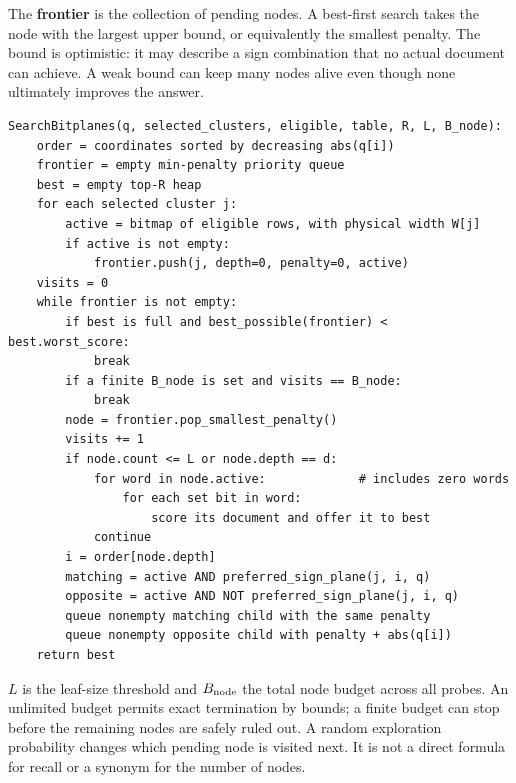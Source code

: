 The \textbf{frontier} is the collection of pending nodes. A best-first search takes the node
with the largest upper bound, or equivalently the smallest penalty. The bound is optimistic:
it may describe a sign combination that no actual document can achieve. A weak bound can keep
many nodes alive even though none ultimately improves the answer.

\par\noindent\begin{minipage}{\linewidth}
\begin{lstlisting}[caption={Dense bitplane search across the selected clusters.}]
SearchBitplanes(q, selected_clusters, eligible, table, R, L, B_node):
    order = coordinates sorted by decreasing abs(q[i])
    frontier = empty min-penalty priority queue
    best = empty top-R heap
    for each selected cluster j:
        active = bitmap of eligible rows, with physical width W[j]
        if active is not empty:
            frontier.push(j, depth=0, penalty=0, active)
    visits = 0
    while frontier is not empty:
        if best is full and best_possible(frontier) < best.worst_score:
            break
        if a finite B_node is set and visits == B_node:
            break
        node = frontier.pop_smallest_penalty()
        visits += 1
        if node.count <= L or node.depth == d:
            for word in node.active:             # includes zero words
                for each set bit in word:
                    score its document and offer it to best
            continue
        i = order[node.depth]
        matching = active AND preferred_sign_plane(j, i, q)
        opposite = active AND NOT preferred_sign_plane(j, i, q)
        queue nonempty matching child with the same penalty
        queue nonempty opposite child with penalty + abs(q[i])
    return best
\end{lstlisting}
\end{minipage}\par
$L$ is the leaf-size threshold and $B_{\rm node}$ the total node budget across all probes.
An unlimited budget permits exact termination by bounds; a finite budget can stop before the
remaining nodes are safely ruled out. A random exploration probability changes which pending
node is visited next. It is not a direct formula for recall or a synonym for the number of nodes.

